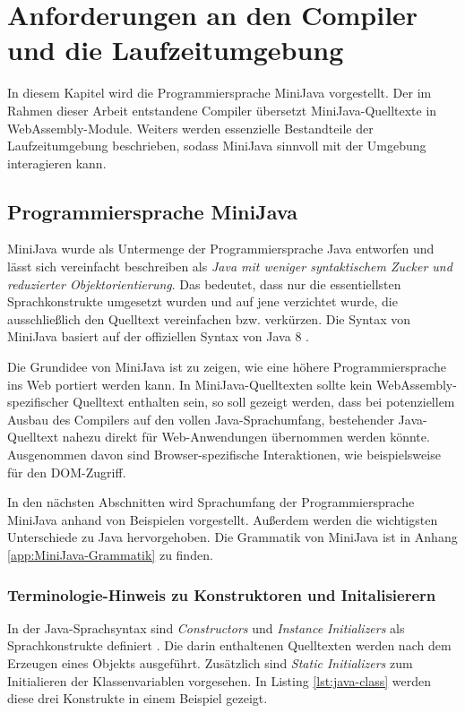 \chapter{Anforderungen an den Compiler und die Laufzeitumgebung}
\label{cha:MiniJava}

In diesem Kapitel wird die Programmiersprache MiniJava vorgestellt. Der im Rahmen dieser Arbeit entstandene Compiler übersetzt MiniJava-Quelltexte in WebAssembly-Module. Weiters werden essenzielle Bestandteile der Laufzeitumgebung beschrieben, sodass MiniJava sinnvoll mit der Umgebung interagieren kann.

\section{Programmiersprache MiniJava}

MiniJava wurde als Untermenge der Programmiersprache Java entworfen und lässt sich vereinfacht beschreiben als \emph{Java mit weniger syntaktischem Zucker und reduzierter Objektorientierung}. Das bedeutet, dass nur die essentiellsten Sprachkonstrukte umgesetzt wurden und auf jene verzichtet wurde, die ausschließlich den Quelltext vereinfachen bzw. verkürzen. Die Syntax von MiniJava basiert auf der offiziellen Syntax von Java 8 \cite{Java8Specification}.

Die Grundidee von MiniJava ist zu zeigen, wie eine höhere Programmiersprache ins Web portiert werden kann. In MiniJava-Quelltexten sollte kein WebAssembly-spezifischer Quelltext enthalten sein, so soll gezeigt werden, dass bei potenziellem Ausbau des Compilers auf den vollen Java-Sprachumfang, bestehender Java-Quelltext nahezu direkt für Web-Anwendungen übernommen werden könnte. Ausgenommen davon sind Browser-spezifische Interaktionen, wie beispielsweise für den DOM-Zugriff.

In den nächsten Abschnitten wird Sprachumfang der Programmiersprache MiniJava anhand von Beispielen vorgestellt. Außerdem werden die wichtigsten Unterschiede zu Java hervorgehoben. Die Grammatik von MiniJava ist in Anhang \ref{app:MiniJava-Grammatik} zu finden.

\subsection{Terminologie-Hinweis zu Konstruktoren und Initalisierern}

In der Java-Sprachsyntax sind \emph{Constructors} und \emph{Instance Initializers} als Sprachkonstrukte definiert \cite{Java8Specification}. Die darin enthaltenen Quelltexten werden nach dem Erzeugen eines Objekts ausgeführt. Zusätzlich sind \emph{Static Initializers} zum Initialieren der Klassenvariablen vorgesehen. In Listing \ref{lst:java-class} werden diese drei Konstrukte in einem Beispiel gezeigt.

